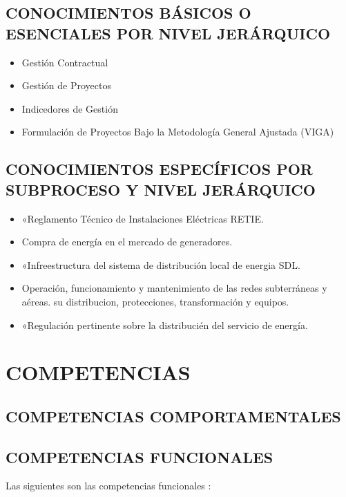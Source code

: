 \documentclass[a5paper]{book}%
\begin{document}
\subsection{CONOCIMIENTOS  BÁSICOS O ESENCIALES  POR NIVEL JERÁRQUICO}


\begin{itemize}
	\item Gestión Contractual
	\item  Gestión de Proyectos
	\item Indicedores de Gestión
	\item Formulación de Proyectos Bajo la Metodología General Ajustada (VIGA)
\end{itemize}

\subsection{CONOCIMIENTOS ESPECÍFICOS POR SUBPROCESO Y NIVEL JERÁRQUICO}

\begin{itemize}
	\item «Reglamento Técnico de Instalaciones Eléctricas RETIE.
	\item Compra de energía en el mercado de generadores.
	\item «Infreestructura del sistema de distribución local de energia SDL.
	\item Operación, funcionamiento y mantenimiento de las redes subterráneas y aéreas.
	su distribucion, protecciones, transformación y equipos.
	\item «Regulación pertinente sobre la distribucién del servicio de energía.
\end{itemize}

\section{COMPETENCIAS}

\subsection{COMPETENCIAS COMPORTAMENTALES}

\subsection{COMPETENCIAS FUNCIONALES}

Las siguientes son las competencias funcionales :\\
\end{document}
